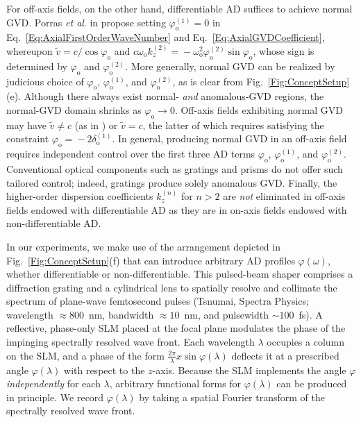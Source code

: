 \documentclass[reprint,
 amsmath,amssymb,
 aps,
]{revtex4-2}
\begin{document}
For off-axis fields, on the other hand, differentiable AD suffices to achieve normal GVD. Porras \textit{et al}. in \cite{Porras03PRE2} propose setting $\varphi_{\mathrm{o}}^{(1)}\!=\!0$ in Eq.~\ref{Eq:AxialFirstOrderWaveNumber} and Eq.~\ref{Eq:AxialGVDCoefficient}, whereupon $\widetilde{v}\!=\!c/\cos{\varphi_{\mathrm{o}}}$ and $c\omega_{\mathrm{o}}k_{z}^{(2)}\!=\!-\omega_{\mathrm{o}}^{2}\varphi_{\mathrm{o}}^{(2)}\sin{\varphi_{\mathrm{o}}}$, whose sign is determined by $\varphi_{\mathrm{o}}$ and $\varphi_{\mathrm{o}}^{(2)}$. More generally, normal GVD can be realized by judicious choice of $\varphi_{\mathrm{o}}$, $\varphi_{\mathrm{o}}^{(1)}$, and $\varphi_{\mathrm{o}}^{(2)}$, as is clear from Fig.~\ref{Fig:ConceptSetup}(e). Although there always exist normal- \textit{and} anomalous-GVD regions, the normal-GVD domain shrinks as $\varphi_{\mathrm{o}}\!\rightarrow\!0$. Off-axis fields exhibiting normal GVD may have $\widetilde{v}\!\neq\!c$ (as in \cite{Porras03PRE2}) or $\widetilde{v}\!=\!c$, the latter of which requires satisfying the constraint $\varphi_{\mathrm{o}}\!=\!-2\delta_{\mathrm{o}}^{(1)}$. In general, producing normal GVD in an off-axis field requires independent control over the first three AD terms $\varphi_{\mathrm{o}}$, $\varphi_{\mathrm{o}}^{(1)}$, and $\varphi_{\mathrm{o}}^{(2)}$. Conventional optical components such as gratings and prisms do not offer such tailored control; indeed, gratings produce solely anomalous GVD. Finally, the higher-order dispersion coefficients $k_{z}^{(n)}$ for $n\!>\!2$ are \textit{not} eliminated in off-axis fields endowed with differentiable AD as they are in on-axis fields endowed with non-differentiable AD. 

In our experiments, we make use of the arrangement depicted in Fig.~\ref{Fig:ConceptSetup}(f) that can introduce arbitrary AD profiles $\varphi(\omega)$, whether differentiable or non-differentiable. This pulsed-beam shaper comprises a diffraction grating and a cylindrical lens to spatially resolve and collimate the spectrum of plane-wave femtosecond pulses (Tsnumai, Spectra Physics; wavelength $\approx\!800$~nm, bandwidth $\approx\!10$~nm, and pulsewidth $\sim\!100$~fs). A reflective, phase-only SLM placed at the focal plane modulates the phase of the impinging spectrally resolved wave front. Each wavelength $\lambda$ occupies a column on the SLM, and a phase of the form $\tfrac{2\pi}{\lambda}x\sin{\varphi(\lambda)}$ deflects it at a prescribed angle $\varphi(\lambda)$ with respect to the $z$-axis. Because the SLM implements the angle $\varphi$ \textit{independently} for each $\lambda$, arbitrary functional forms for $\varphi(\lambda)$ can be produced in principle. We record $\varphi(\lambda)$ by taking a spatial Fourier transform of the spectrally resolved wave front.
\end{document}
